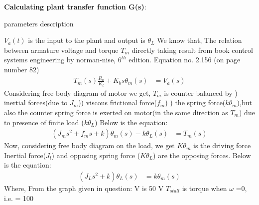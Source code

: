 \begin{enumerate}[label=\thesection.\arabic*.,ref=\thesection.\theenumi]
\textbf{Calculating plant transfer function G(s)}:\newline\newline
\begin{table}[!ht]
\centering

\caption{parameters description}
\label{table:ee18btech110019_2}
\end{table}
$V_a(t)$ is the input to the plant and output is $\theta_L$\newline
We know that,\newline
The relation between armature voltage and torque $T_m$ \newline
directly taking result from book control systems engineering by norman-nise, $6^{th}$ edition. Equation no. 2.156 (on page number 82)\newline
\begin{align}
    T_m(s)\frac{R_a}{K_t} + K_bs\theta_m(s)  &=  V_a(s)
\end{align}
Considering free-body diagram of motor we get,\newline 
$T_m$ is counter balanced by ) inertial forces(due to $J_m$)) viscous frictional force($f_m$) ) the spring force($k\theta_m$),\newline but also the counter spring force is exerted on motor(in the same direction as $T_m$) due to presence of finite load ($k\theta_L$)\newline
Below is the equation:\newline
\begin{align}
    (J_ms^2 + f_ms + k)\theta_m(s) - k\theta_L(s)  &=  T_m(s) 
\end{align}
Now, considering free body diagram on  the load, we get\newline
$K\theta_m$ is the driving force\newline
Inertial force($J_l$) and opposing spring force ($K\theta_L$) are the opposing forces.\newline
Below is the equation:\newline
\begin{align}
   (J_Ls^2 + k)\theta_L(s)  &=  k\theta_m(s)
\end{align}
Where, \newline
From the graph given in question:\newline
V is 50 V\newline
$T_{stall}$ is torque when $\omega$ =0, i.e. = 100\newline

\end{enumerate}
